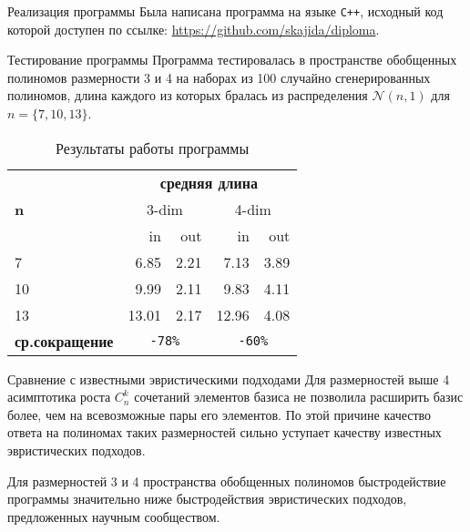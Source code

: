 \documentclass{beamer}
\begin{document}
\begin{frame}{Реализация программы}
Была написана программа на языке \texttt{C++}, исходный код которой доступен по ссылке: \url{https://github.com/skajida/diploma}.
\end{frame}

\begin{frame}{Тестирование программы}
Программа тестировалась в пространстве обобщенных полиномов размерности 3 и 4 на наборах из 100 случайно сгенерированных полиномов, длина каждого из которых бралась из распределения $ \mathcal{N} (n, 1) $ для $ n = \{ 7, 10, 13 \} $.

\begin{table}
\caption{Результаты работы программы}
\label{table_results}
\centering
\begin{tabular}{ |l||r|r||r|r| } \hline
\multirow{3}{*}{\bf n} & \multicolumn{4}{c|}{\bf средняя длина} \\ \cline{2-5}
    & \multicolumn{2}{c||}{3-dim} & \multicolumn{2}{c|}{4-dim} \\ \cline{2-5}
    & in    & out  & in    & out  \\ \hline \hline
7   & 6.85  & 2.21 & 7.13  & 3.89 \\ \hline
10  & 9.99  & 2.11 & 9.83  & 4.11 \\ \hline
13  & 13.01 & 2.17 & 12.96 & 4.08 \\ \hline \hline
\textbf{ср.сокращение} & \multicolumn{2}{c||}{\tt -78\%} & \multicolumn{2}{c|}{\tt -60\%} \\ \hline
\end{tabular}
\end{table}

\end{frame}

\begin{frame}{Сравнение с известными эвристическими подходами}
Для размерностей выше 4 асимптотика роста $ C_n^k $ сочетаний элементов базиса не позволила расширить базис более, чем на всевозможные пары его элементов. По этой причине качество ответа на полиномах таких размерностей сильно уступает качеству известных эвристических подходов.

Для размерностей 3 и 4 пространства обобщенных полиномов быстродействие программы значительно ниже быстродействия эвристических подходов, предложенных научным сообществом.
\end{frame}
\end{document}
